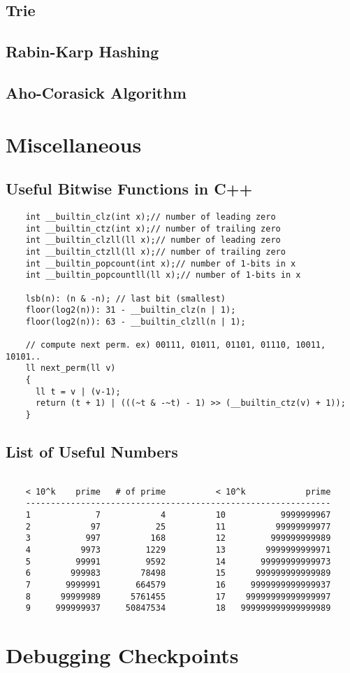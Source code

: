 \documentclass[landscape,8pt]{article}
\begin{document}
\begin{multicols}{2}
  \subsection{Trie}

  \subsection{Rabin-Karp Hashing}

  \subsection{Aho-Corasick Algorithm}
\columnbreak

\section{Miscellaneous}
  \subsection{Useful Bitwise Functions in C++}
  \begin{verbatim}
    int __builtin_clz(int x);// number of leading zero
    int __builtin_ctz(int x);// number of trailing zero
    int __builtin_clzll(ll x);// number of leading zero
    int __builtin_ctzll(ll x);// number of trailing zero
    int __builtin_popcount(int x);// number of 1-bits in x
    int __builtin_popcountll(ll x);// number of 1-bits in x

    lsb(n): (n & -n); // last bit (smallest)
    floor(log2(n)): 31 - __builtin_clz(n | 1);
    floor(log2(n)): 63 - __builtin_clzll(n | 1);

    // compute next perm. ex) 00111, 01011, 01101, 01110, 10011, 10101..
    ll next_perm(ll v)
    {
      ll t = v | (v-1);
      return (t + 1) | (((~t & -~t) - 1) >> (__builtin_ctz(v) + 1));
    }
  \end{verbatim}
  \columnbreak
  \subsection{List of Useful Numbers}
  \begin{verbatim}

    < 10^k    prime   # of prime          < 10^k            prime
    -------------------------------------------------------------
    1             7            4          10           9999999967
    2            97           25          11          99999999977
    3           997          168          12         999999999989
    4          9973         1229          13        9999999999971
    5         99991         9592          14       99999999999973
    6        999983        78498          15      999999999999989
    7       9999991       664579          16     9999999999999937
    8      99999989      5761455          17    99999999999999997
    9     999999937     50847534          18   999999999999999989
  \end{verbatim}
\columnbreak

\section{Debugging Checkpoints}
\end{multicols}
\end{document}
